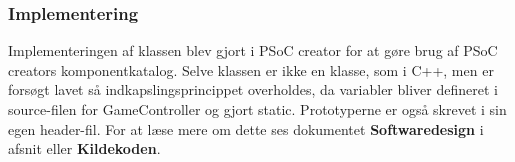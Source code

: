 \documentclass[Rapport/Playerside/GameController/GameController.tex]{subfiles}
\begin{document}
\subsubsection{Implementering}
Implementeringen af klassen blev gjort i PSoC creator for at gøre brug af PSoC creators komponentkatalog. Selve klassen er ikke en klasse, som i C++, men er forsøgt lavet så indkapslingsprincippet overholdes, da variabler bliver defineret i source-filen for GameController og gjort static. Prototyperne er også skrevet i sin egen header-fil. For at læse mere om dette ses dokumentet \textbf{Softwaredesign} i afsnit  eller \textbf{Kildekoden}. 
\end{document}
